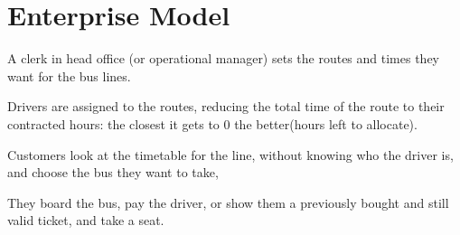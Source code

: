 \section{Enterprise Model}
A clerk in head office (or operational manager) sets the routes and times they want for the bus lines.

\medskip

Drivers are assigned to the routes, reducing the total time of the route to their contracted hours: the closest it gets to 0 the better(hours left to allocate).

\medskip

Customers look at the timetable for the line, without knowing who the driver is, and choose the bus they want to take,

\medskip

They board the bus, pay the driver, or show them a previously bought and still valid ticket, and take a seat.
